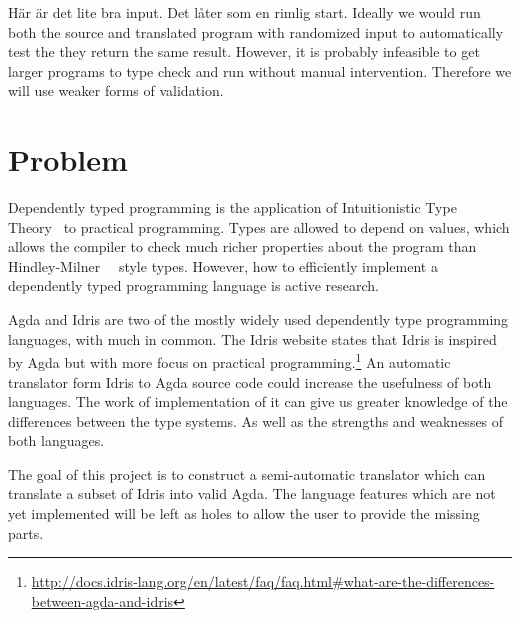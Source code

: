 \documentclass[parskip=half]{scrartcl}
\begin{document}

Här är det lite bra input. Det låter som en rimlig start.
Ideally we would run both the source and translated program with randomized
input to automatically test the they return the same result. However, it is
probably infeasible to get larger programs to type check and run without manual
intervention.  Therefore we will use weaker forms of validation.

\section{Problem}

Dependently typed programming is the application of
Intuitionistic Type Theory~\cite{martinlof} to practical programming.
Types are allowed to depend on values, which allows the compiler to check much
richer properties about the program than Hindley-Milner~\cite{hindley}~\cite{milner}
style types. However, how to efficiently implement a dependently typed
programming language is active research.

Agda and Idris are two of the mostly widely used dependently type programming
languages, with much in common. The Idris website states that Idris is inspired
by Agda but with more focus on practical
programming.\footnote{\url{http://docs.idris-lang.org/en/latest/faq/faq.html\#what-are-the-differences-between-agda-and-idris}}
An automatic translator form Idris to Agda source code could increase the
usefulness of both languages. The work of implementation of it can give us
greater knowledge of the differences between the type systems. As well as the
strengths and weaknesses of both languages.

The goal of this project is to construct a semi-automatic translator which can
translate a subset of Idris into valid Agda. The language features which are
not yet implemented will be left as holes to allow the user to provide the
missing parts.
\end{document}
